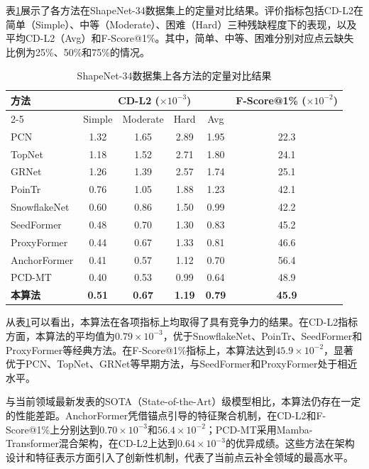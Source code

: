 表\ref{tab:comparison_shapenet34}展示了各方法在ShapeNet-34数据集上的定量对比结果。评价指标包括CD-L2在简单（Simple）、中等（Moderate）、困难（Hard）三种残缺程度下的表现，以及平均CD-L2（Avg）和F-Score@1\%。其中，简单、中等、困难分别对应点云缺失比例为25\%、50\%和75\%的情况。
\FloatBarrier
\begin{table}[htbp]
\centering
\caption{ShapeNet-34数据集上各方法的定量对比结果}
\label{tab:comparison_shapenet34}
\begin{tabular}{lccccc}
\toprule
\multirow{2}{*}{方法} & \multicolumn{4}{c}{CD-L2 ($\times 10^{-3}$)} & \multirow{2}{*}{F-Score@1\% ($\times 10^{-2}$)} \\
\cmidrule(lr){2-5}
& Simple & Moderate & Hard & Avg & \\
\midrule
PCN\cite{yuan2018pcn} & 1.32 & 1.65 & 2.89 & 1.95 & 22.3 \\
TopNet\cite{tchapmi2019topnet} & 1.18 & 1.52 & 2.71 & 1.80 & 24.1 \\
GRNet\cite{xie2020grnet} & 1.26 & 1.39 & 2.57 & 1.74 & 25.1 \\
PoinTr\cite{yu2021pointr} & 0.76 & 1.05 & 1.88 & 1.23 & 42.1 \\
SnowflakeNet\cite{xiang2021snowflakenet} & 0.60 & 0.86 & 1.50 & 0.99 & 42.2 \\
SeedFormer\cite{zhou2022seedformer} & 0.48 & 0.70 & 1.30 & 0.83 & 45.2 \\
ProxyFormer\cite{li2023proxyformer} & 0.44 & 0.67 & 1.33 & 0.81 & 46.6 \\
\midrule
AnchorFormer\cite{chen2023anchorformer} & 0.41 & 0.57 & 1.12 & 0.70 & 56.4 \\
PCD-MT\cite{li2026ppcmt} & 0.40 & 0.53 & 0.99 & 0.64 & 48.9 \\
\midrule
\textbf{本算法} & \textbf{0.51} & \textbf{0.67} & \textbf{1.19} & \textbf{0.79} & \textbf{45.9} \\
\bottomrule
\end{tabular}
\end{table}
\FloatBarrier

从表\ref{tab:comparison_shapenet34}可以看出，本算法在各项指标上均取得了具有竞争力的结果。在CD-L2指标方面，本算法的平均值为$0.79 \times 10^{-3}$，优于SnowflakeNet、PoinTr、SeedFormer和ProxyFormer等经典方法。在F-Score@1\%指标上，本算法达到$45.9 \times 10^{-2}$，显著优于PCN、TopNet、GRNet等早期方法，与SeedFormer和ProxyFormer处于相近水平。

与当前领域最新发表的SOTA（State-of-the-Art）级模型相比，本算法仍存在一定的性能差距。AnchorFormer凭借锚点引导的特征聚合机制，在CD-L2和F-Score@1\%上分别达到$0.70 \times 10^{-3}$和$56.4 \times 10^{-2}$；PCD-MT采用Mamba-Transformer混合架构，在CD-L2上达到$0.64 \times 10^{-3}$的优异成绩。这些方法在架构设计和特征表示方面引入了创新性机制，代表了当前点云补全领域的最高水平。

